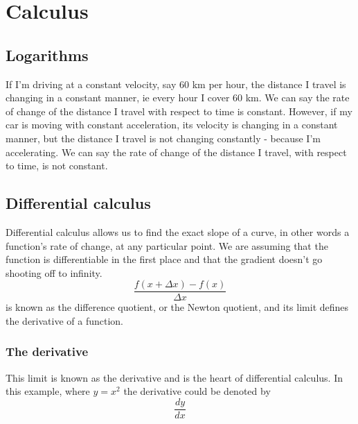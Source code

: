 \chapter{Calculus}

\section{Logarithms}
If I'm driving at a constant velocity, say 60 km per hour, the distance I travel is changing in a constant manner, ie every hour I cover 60 km. We can say the rate of change of the distance I travel with respect to time is constant. However, if my car is moving with constant acceleration, its velocity is changing in a constant manner, but the distance I travel is not changing constantly - because I'm accelerating. We can say the rate of change of the distance I travel, with respect to time, is not constant.

\section{Differential calculus}
Differential calculus allows us to find the exact slope of a curve, in other words a function's rate of change, at any particular point. We are assuming that the function is differentiable in the first place and that the gradient doesn't go shooting off to infinity.
\[
\frac{f(x + \Delta x) - f(x)}{\Delta x}
\]
is known as the difference quotient, or the Newton quotient, and its limit defines the derivative of a function.


\subsection{The derivative}
This limit is known as the derivative and is the heart of differential calculus. In this example, where $y = x^2$ the derivative could be denoted by
\[
\frac{dy}{dx}
\]

